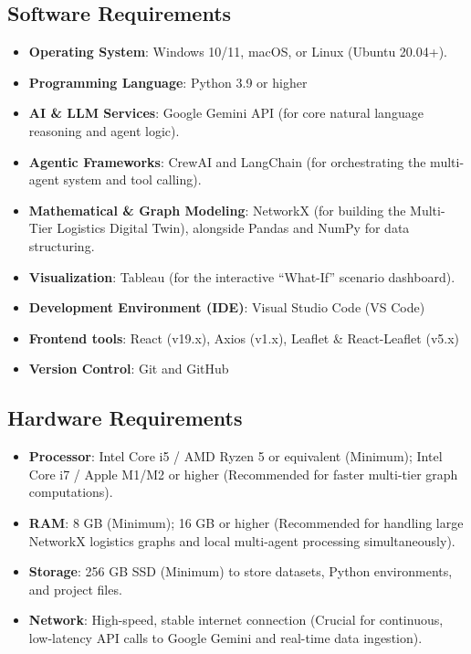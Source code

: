 \subsection[Software Requirements]{Software Requirements}
\begin{itemize}
    \item \textbf{Operating System}: Windows 10/11, macOS, or Linux (Ubuntu 20.04+).
    \item \textbf{Programming Language}: Python 3.9 or higher
    \item \textbf{AI \& LLM Services}: Google Gemini API (for core natural language reasoning and agent logic).
    \item \textbf{Agentic Frameworks}: CrewAI and LangChain (for orchestrating the multi-agent system and tool calling).
    \item \textbf{Mathematical \& Graph Modeling}: NetworkX (for building the Multi-Tier Logistics Digital Twin), alongside Pandas and NumPy for data structuring.
    \item \textbf{Visualization}: Tableau (for the interactive ``What-If'' scenario dashboard).
    \item \textbf{Development Environment (IDE)}: Visual Studio Code (VS Code)
    \item \textbf{Frontend tools}: React (v19.x), Axios (v1.x), Leaflet \& React-Leaflet (v5.x)
    \item \textbf{Version Control}: Git and GitHub
\end{itemize}

\subsection[Hardware Requirements]{Hardware Requirements}
\begin{itemize}
    \item \textbf{Processor}: Intel Core i5 / AMD Ryzen 5 or equivalent (Minimum); Intel Core i7 / Apple M1/M2 or higher (Recommended for faster multi-tier graph computations).
\item \textbf{RAM}: 8 GB (Minimum); 16 GB or higher (Recommended for handling large NetworkX logistics graphs and local multi-agent processing simultaneously).
\item \textbf{Storage}: 256 GB SSD (Minimum) to store datasets, Python environments, and project files.
\item \textbf{Network}: High-speed, stable internet connection (Crucial for continuous, low-latency API calls to Google Gemini and real-time data ingestion).
\end{itemize}
